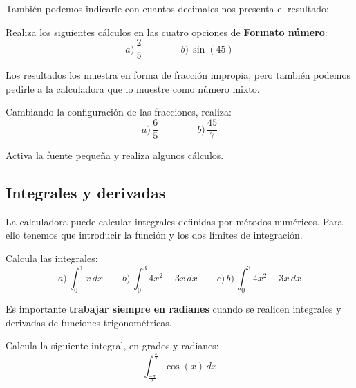 \documentclass[12pt]{article}
\newenvironment{capitulo}{\begin{tcolorbox}[colback=blue!5!white,colframe=red!75!black]}{\end{tcolorbox}\bigskip}
\newenvironment{ejer}{\begin{tcolorbox}[center title, 
fonttitle=\sffamily\bfseries,colback=blue!5,colframe=orange]}{\end{tcolorbox}}
\begin{document}
También podemos indicarle con cuantos decimales nos presenta el resultado:

\begin{ejer}

Realiza los siguientes cálculos en las cuatro opciones de \textbf{Formato número}:
\[
a)\, \frac{2}{5} \qquad \qquad b)\, \sin(45)
\]


\end{ejer}

Los resultados los muestra en forma de fracción impropia, pero también podemos pedirle a la calculadora que lo muestre como número mixto.

\begin{ejer}

Cambiando la configuración de las fracciones, realiza:
\[
a)\, \frac{6}{5} \qquad \qquad b)\, \frac{45}{7}
\]


\end{ejer}

\begin{ejer}

Activa la fuente pequeña y realiza algunos cálculos.


\end{ejer}

\newpage

\begin{capitulo}
\section*{Integrales y derivadas}
\end{capitulo}

La calculadora puede calcular integrales definidas por métodos numéricos. Para ello tenemos que introducir la función y los dos límites de integración.



\begin{ejer}

Calcula las integrales:\vspace{-3mm}
\[
a)\, \int_0^1 x\, dx \qquad b)\, \int_0^3 4x^2-3x\, dx  \qquad c)\,b)\, \int_0^3 4x^2-3x\, dx
\]

\end{ejer}

Es importante \textbf{trabajar siempre en radianes} cuando se realicen integrales y derivadas de funciones trigonométricas.

\begin{ejer}
Calcula la siguiente integral, en grados y radianes: \vspace{-3mm}
\[
 \int_{\frac{-\pi}{2}}^{\frac{\pi}{2}} \cos(x)\, dx
\] 

\end{ejer}
\end{document}

